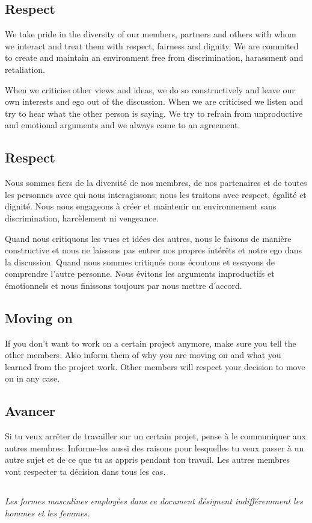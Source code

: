 \english
	\subsection{Respect}
 	We take pride in the diversity of our members, partners and others with whom we interact and treat them with respect, fairness and dignity. We are commited to create and maintain an environment free from discrimination, harassment and retaliation. 

 	When we criticise other views and ideas, we do so constructively and leave our own interests and ego out of the discussion. 
 	When we are criticised we listen and try to hear what the other person is saying. 
 	We try to refrain from unproductive and emotional arguments and we always come to an agreement.


\french
	\subsection{Respect}
	Nous sommes fiers de la diversité de nos membres, de nos partenaires et de toutes les personnes avec qui nous interagissons; nous les traitons avec respect, égalité et dignité. Nous nous engageons à créer et maintenir un environnement sans discrimination, harcèlement ni vengeance. 

	Quand nous critiquons les vues et idées des autres, nous le faisons de manière constructive et nous ne laissons pas entrer nos propres intérêts et notre ego dans la discussion.
	Quand nous sommes critiqués nous écoutons et essayons de comprendre l'autre personne. 
	Nous évitons les arguments improductifs et émotionnels et nous finissons toujours par nous mettre d'accord.

\english
	\subsection{Moving on}
	If you don't want to work on a certain project anymore, make sure you tell the other members. Also inform them of why you are moving on and what you learned from the project work. Other members will respect your decision to move on in any case.

\french
	\subsection{Avancer}
	Si tu veux arrêter de travailler sur un certain projet, pense à le communiquer aux autres membres. Informe-les aussi des raisons pour lesquelles tu veux passer à un autre sujet et de ce que tu as appris pendant ton travail. Les autres membres vont respecter ta décision dans tous les cas.

	\subsection*{}
	\textit{Les formes masculines employées dans ce document désignent indifféremment les hommes et les femmes.}


